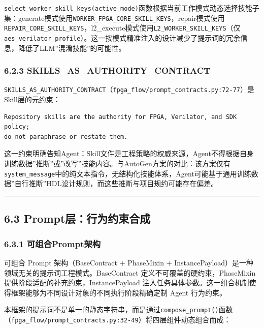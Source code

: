 \texttt{select\_worker\_skill\_keys(active\_mode)}函数根据当前工作模式动态选择技能子集：generate模式使用\texttt{WORKER\_FPGA\_CORE\_SKILL\_KEYS}，repair模式使用\texttt{REPAIR\_CORE\_SKILL\_KEYS}，l2\_execute模式使用\texttt{L2\_WORKER\_SKILL\_KEYS}（仅\texttt{aes\_verilator\_profile}）。这一按模式精准注入的设计减少了提示词的冗余信息，降低了LLM''混淆技能''的可能性。

\subsubsection{6.2.3
SKILLS\_AS\_AUTHORITY\_CONTRACT}\label{skills_as_authority_contract}

\texttt{SKILLS\_AS\_AUTHORITY\_CONTRACT}（\texttt{fpga\_flow/prompt\_contracts.py:72-77}）是Skill层的元约束：

\begin{verbatim}
Repository skills are the authority for FPGA, Verilator, and SDK policy;
do not paraphrase or restate them.
\end{verbatim}

这一约束明确告知Agent：Skill文件是工程策略的权威来源，Agent不得根据自身训练数据''推断''或''改写''技能内容。与AutoGen方案的对比：该方案仅有\texttt{system\_message}中的纯文本指令，无结构化技能体系，Agent可能基于通用训练数据''自行推断''HDL设计规则，而这些推断与项目规约可能存在偏差。

\begin{center}\rule{0.5\linewidth}{0.5pt}\end{center}

\subsection{6.3
Prompt层：行为约束合成}\label{promptux5c42ux884cux4e3aux7ea6ux675fux5408ux6210}

\subsubsection{6.3.1
可组合Prompt架构}\label{ux53efux7ec4ux5408promptux67b6ux6784}

可组合 Prompt 架构（BaseContract + PhaseMixin +
InstancePayload）是一种领域无关的提示词工程模式。BaseContract
定义不可覆盖的硬约束，PhaseMixin 提供阶段适配的补充约束，InstancePayload
注入任务具体参数。这一组合机制使得框架能够为不同设计对象的不同执行阶段精确定制
Agent 行为约束。

本框架的提示词不是单一的静态字符串，而是通过\texttt{compose\_prompt()}函数（\texttt{fpga\_flow/prompt\_contracts.py:32-49}）将四层组件动态组合而成：

